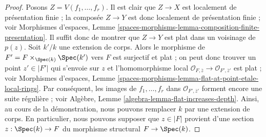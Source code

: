\begin{proof}
Posons $Z = V(f_1, \ldots, f_r)$. Il est clair que $Z \to X$ est localement de
présentation finie ; la composée $Z \to Y$ est donc localement de
présentation finie ; voir
Morphismes d'espaces,
Lemme \ref{spaces-morphisms-lemma-composition-finite-presentation}.
Il suffit donc de montrer que $Z \to Y$ est plat dans un voisinage de $p(z)$.
Soit $k'/k$ une extension de corps. Alors le morphisme de
$F' = F \times_{\Spec(k)} \Spec(k')$ vers
$F$ est surjectif et plat ; on peut donc trouver un point $z' \in |F'|$ qui s'envoie sur $z$
et l'homomorphisme local
$\mathcal{O}_{F, \overline{z}} \to \mathcal{O}_{F', \overline{z}'}$ est
plat ; voir
Morphismes d'espaces,
Lemme \ref{spaces-morphisms-lemma-flat-at-point-etale-local-rings}.
Par conséquent, les images de $f_1, \ldots, f_r$ dans
$\mathcal{O}_{F', \overline{z}'}$ forment encore une suite régulière ; voir
Algèbre, Lemme \ref{algebra-lemma-flat-increases-depth}.
Ainsi, au cours de la démonstration, nous pouvons remplacer $k$ par une extension de corps.
En particulier, nous pouvons supposer que $z \in |F|$ provient d'une section
$z : \Spec(k) \to F$ du morphisme structural $F \to \Spec(k)$.


\end{proof}
